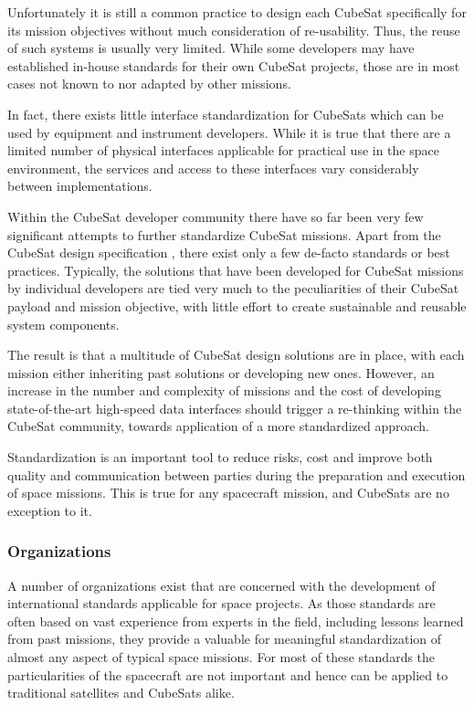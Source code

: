 Unfortunately it is still a common practice to design each CubeSat specifically for its mission objectives without much consideration of re-usability. Thus, the reuse of such systems is usually very limited. While some developers may have established in-house standards for their own CubeSat projects, those are in most cases not known to nor adapted by other missions.

In fact, there exists little interface standardization for CubeSats which can be used by equipment and instrument developers. While it is true that there are a limited number of physical interfaces applicable for practical use in the space environment, the services and access to these interfaces vary considerably between implementations.

Within the CubeSat developer community there have so far been very few significant attempts to further standardize CubeSat missions. Apart from the CubeSat design specification \cite{cubesat_design_specification}, there exist only a few de-facto standards or best practices. Typically, the solutions that have been developed for CubeSat missions by individual developers are tied very much to the peculiarities of their CubeSat payload and mission objective, with little effort to create sustainable and reusable system components.

The result is that a multitude of CubeSat design solutions are in place, with each mission either inheriting past solutions or developing new ones. However, an increase in the number and complexity of missions and the cost of developing state-of-the-art high-speed data interfaces should trigger a re-thinking within the CubeSat community, towards application of a more standardized approach.

Standardization is an important tool to reduce risks, cost and improve both quality and communication between parties during the preparation and execution of space missions. This is true for any spacecraft mission, and CubeSats are no exception to it.

\subsubsection{Organizations}

A number of organizations exist that are concerned with the development of international standards applicable for space projects. As those standards are often based on vast experience from experts in the field, including lessons learned from past missions, they provide a valuable for meaningful standardization of almost any aspect of typical space missions. For most of these standards the particularities of the spacecraft are not important and hence can be applied to traditional satellites and CubeSats alike.

